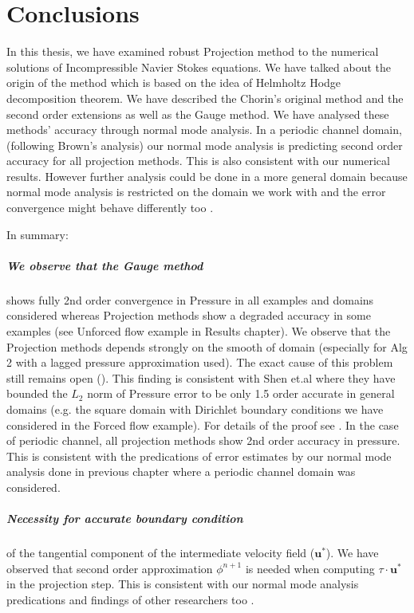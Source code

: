 
\chapter{Conclusions}
\label{chapter8}
In this thesis, we have examined robust Projection method to the numerical solutions of Incompressible Navier Stokes equations. We have talked about the origin of the method which is based on the idea of Helmholtz Hodge decomposition theorem. We have described the Chorin's original method and the second order extensions as well as the Gauge method. We have analysed these methods' accuracy through normal mode analysis. In a periodic channel domain,(following Brown's analysis) our normal mode analysis is predicting second order accuracy for all projection methods. This is also consistent with our numerical results. However further analysis could be done in a more general domain because normal mode analysis is restricted on the domain we work with and the error convergence might behave differently too \cite{pyo2005normal}. 

In summary:
\paragraph*{We observe that the Gauge method} shows fully 2nd order convergence in Pressure in all examples and domains considered whereas Projection methods show a degraded accuracy in some examples (see Unforced flow example in Results chapter). 
We observe that the Projection methods depends strongly on the smooth of domain (especially for Alg 2 with a lagged pressure approximation used). The exact cause of this problem still remains open (\cite{guermond2004error}). This finding is consistent with Shen et.al where they have bounded the $L_2$ norm of Pressure error to be only 1.5 order accurate in general domains (e.g. the square domain with Dirichlet boundary conditions we have considered in the Forced flow example). For details of the proof see \cite{guermond2004error, pyo2005normal}. In the case of periodic channel, all projection methods show 2nd order accuracy in pressure. This is consistent with the predications of error estimates by our normal mode analysis done in previous chapter where a periodic channel domain was considered. 

\paragraph*{Necessity for accurate boundary condition} of the tangential component of the intermediate velocity field ($\textbf{u}^*$).
We have observed that second order approximation $\phi^{n+1}$ is needed when computing $\textbf{$\tau$}\cdot\textbf{u}^*$ in the projection step. This is consistent with our normal mode analysis predications and findings of other researchers too \cite{brown2001accurate}.

